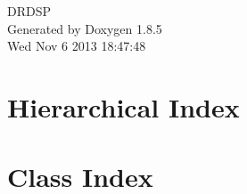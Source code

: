 \documentclass[twoside]{book}
\newcommand{\clearemptydoublepage}{%
  \newpage{\pagestyle{empty}\cleardoublepage}%
}
\begin{document}
\hypersetup{pageanchor=false}
\begin{titlepage}
\vspace*{7cm}
\begin{center}%
{\Large D\-R\-D\-S\-P }\\
\vspace*{1cm}
{\large Generated by Doxygen 1.8.5}\\
\vspace*{0.5cm}
{\small Wed Nov 6 2013 18:47:48}\\
\end{center}
\end{titlepage}
\clearemptydoublepage
\tableofcontents
\clearemptydoublepage
{}
\hypersetup{pageanchor=true}

\chapter{Hierarchical Index}

\chapter{Class Index}

\end{document}
